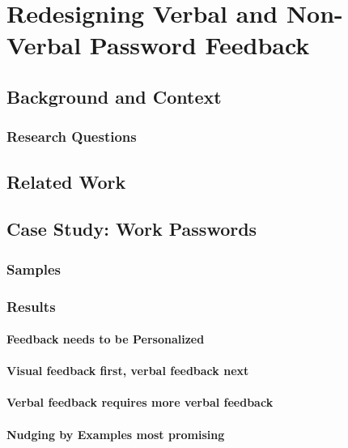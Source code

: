 \chapter[Redesigning Verbal and Non-Verbal Password Feedback]{Redesigning Verbal and Non-Verbal Password Feedback}\label{chap:case_study_work_pws}


\section{Background and Context}

\subsection{Research Questions}

\section{Related Work}

\section{Case Study: Work Passwords}

\subsection{Samples}
\subsection{Results}

\subsubsection{Feedback needs to be Personalized}
\subsubsection{Visual feedback first, verbal feedback next}
\subsubsection{Verbal feedback requires more verbal feedback}
\subsubsection{Nudging by Examples most promising}


